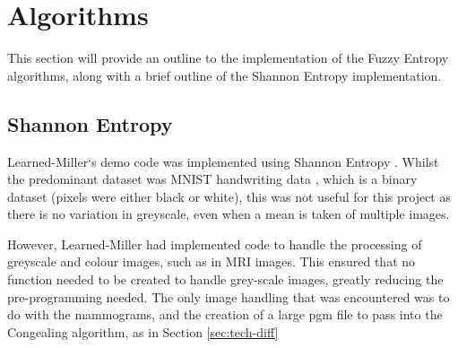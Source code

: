 \section{Algorithms}

This section will provide an outline to the implementation of the Fuzzy Entropy algorithms, along with a brief outline of the Shannon Entropy implementation.

\subsection{Shannon Entropy}

Learned-Miller`s demo code was implemented using Shannon Entropy \cite{joint-alignment}. Whilst the predominant dataset was MNIST handwriting data \cite{lecun1998gradientbased}, which is a binary dataset (pixels were either black or white), this was not useful for this project as there is no variation in greyscale, even when a mean is taken of multiple images.

However, Learned-Miller had implemented code to handle the processing of greyscale and colour images, such as in MRI images. This ensured that no function needed to be created to handle grey-scale images, greatly reducing the pre-programming needed. The only image handling that was encountered was to do with the mammograms, and the creation of a large pgm file to pass into the \Gls{Congealing} algorithm, as in Section \ref{sec:tech-diff}
